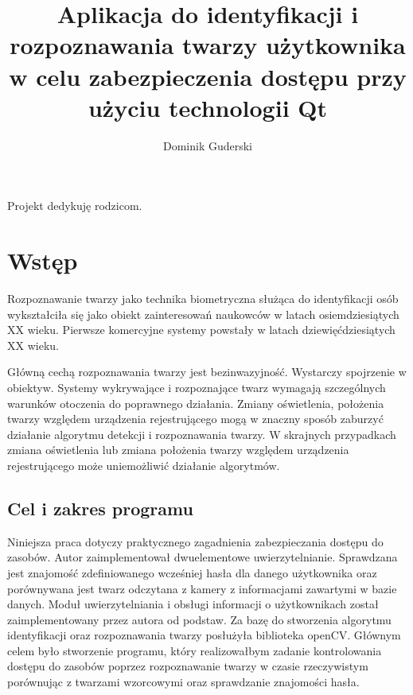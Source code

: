 \documentclass[eng,printmode]{mgr}
\title{Aplikacja do identyfikacji i rozpoznawania twarzy użytkownika w celu zabezpieczenia dostępu przy użyciu technologii Qt}
\author{Dominik Guderski}
\begin{document}

\maketitle %
\dedication{6cm}{Projekt dedykuję rodzicom.}

\tableofcontents %


\chapter{Wstęp}

Rozpoznawanie twarzy jako technika biometryczna służąca do identyfikacji osób wykształciła się jako obiekt zainteresowań naukowców w latach osiemdziesiątych XX wieku. Pierwsze komercyjne systemy powstały w latach dziewięćdziesiątych XX wieku.\cite{historyreco}

Główną cechą rozpoznawania twarzy jest bezinwazyjność. Wystarczy spojrzenie w obiektyw. Systemy wykrywające i rozpoznające twarz wymagają szczególnych warunków otoczenia do poprawnego działania. Zmiany oświetlenia, położenia twarzy względem urządzenia rejestrującego mogą w znaczny sposób zaburzyć działanie algorytmu detekcji i rozpoznawania twarzy. W skrajnych przypadkach zmiana oświetlenia lub zmiana położenia twarzy względem urządzenia rejestrującego może uniemożliwić działanie algorytmów.
\section{Cel i zakres programu}
Niniejsza praca dotyczy praktycznego zagadnienia zabezpieczania dostępu do zasobów. Autor zaimplementował dwuelementowe uwierzytelnianie. Sprawdzana jest znajomość zdefiniowanego wcześniej hasła dla danego użytkownika oraz porównywana jest twarz odczytana z kamery z informacjami zawartymi w bazie danych. Moduł uwierzytelniania i obsługi informacji o użytkownikach został zaimplementowany przez autora od podstaw. Za bazę do stworzenia algorytmu identyfikacji oraz rozpoznawania twarzy posłużyła biblioteka openCV. Głównym celem było stworzenie programu, który realizowałbym zadanie kontrolowania dostępu do zasobów poprzez rozpoznawanie twarzy w czasie rzeczywistym porównując z twarzami wzorcowymi oraz sprawdzanie znajomości hasła.
\end{document}
